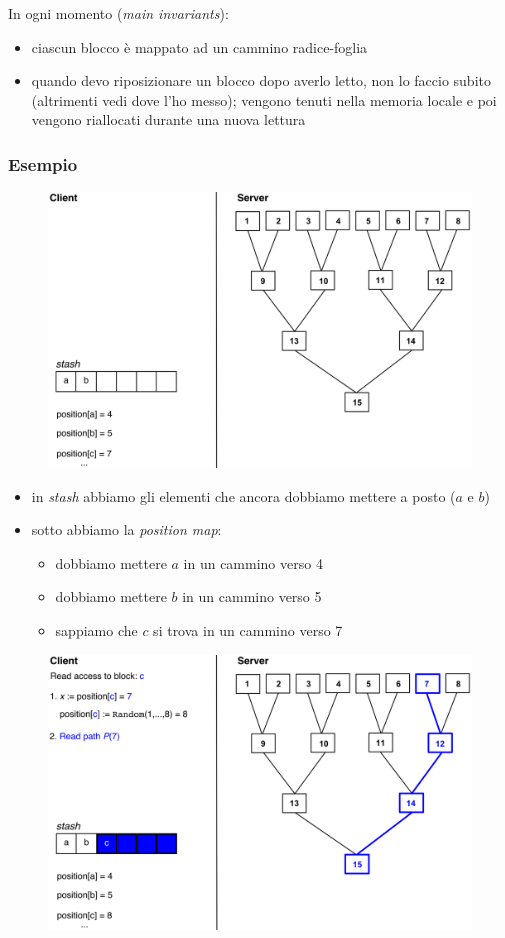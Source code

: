 \documentclass{report}
\begin{document}
In ogni momento (\textit{main invariants}):
\begin{itemize}
    \item ciascun blocco è mappato ad un cammino radice-foglia 
    \item quando devo riposizionare un blocco dopo averlo letto, non lo faccio subito 
    (altrimenti vedi dove l'ho messo); vengono tenuti nella memoria locale e poi 
    vengono riallocati durante una nuova lettura 
\end{itemize}
\newpage
\subsubsection{Esempio}
\begin{figure}[ht]
    \centering
    \includegraphics[width=0.8\linewidth]{images/path-oram.png}
\end{figure}

\begin{itemize}
    \item in \textit{stash} abbiamo gli elementi che ancora dobbiamo mettere a posto ($a$ e $b$)
    \item sotto abbiamo la \textit{position map}:
    \begin{itemize}
        \item dobbiamo mettere $a$ in un cammino verso 4
        \item dobbiamo mettere $b$ in un cammino verso 5
        \item sappiamo che $c$ si trova in un cammino verso 7
    \end{itemize}

\end{itemize}

\begin{figure}[ht]
    \centering
    \includegraphics[width=0.8\linewidth]{images/path-oram2.png}
\end{figure}
\end{document}
